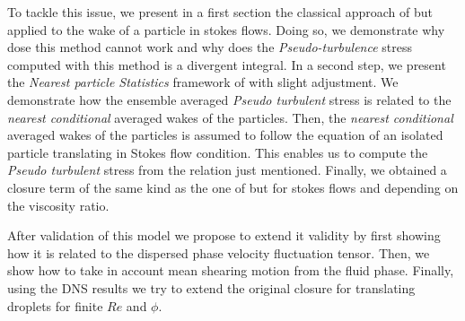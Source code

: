 To tackle this issue, we present in a first section the classical approach of \citet{van1998pseudo} but applied to the wake of a particle in stokes flows. 
Doing so, we demonstrate why dose this method cannot work and why  does the \textit{Pseudo-turbulence} stress computed with this method is a divergent integral. 
In a second step, we present the \textit{Nearest particle Statistics} framework of \citet{zhang2021ensemble} with slight adjustment. 
We demonstrate how the ensemble averaged \textit{Pseudo turbulent} stress is related to the \textit{nearest conditional} averaged wakes of the particles. 
Then, the \textit{nearest conditional} averaged wakes of the particles is assumed to follow the equation of an isolated particle translating in Stokes flow condition. 
This enables us to compute the \textit{Pseudo turbulent} stress from the relation just mentioned. 
Finally, we obtained a closure term of the same kind as the one of \citet{van1998pseudo} but for stokes flows and depending on the viscosity ratio.  

After validation of this model we propose to extend it validity by first showing how it is related to the dispersed phase velocity fluctuation tensor. 
Then, we show how to take in account mean shearing motion from the fluid phase. 
Finally, using the DNS results we try to extend the original closure for translating droplets for finite $Re$ and $\phi$. 